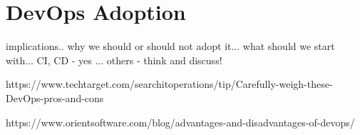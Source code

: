\section{DevOps Adoption} implications.. why we should or should not adopt it... what should we start with... CI, CD - yes ... others - think and discuss!

https://www.techtarget.com/searchitoperations/tip/Carefully-weigh-these-DevOps-pros-and-cons

https://www.orientsoftware.com/blog/advantages-and-disadvantages-of-devops/